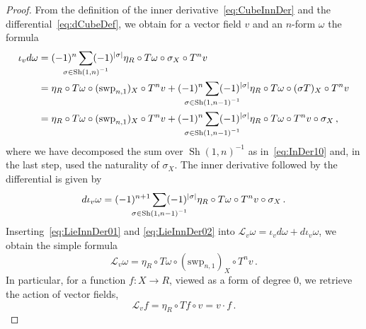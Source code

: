 \documentclass[12pt,reqno, a4paper]{amsart}
\numberwithin{equation}{section}
\theoremstyle{plain}
\theoremstyle{definition}
\theoremstyle{remark}
\DeclareMathOperator{\Shuff}{Sh}
\newcommand{\Lie}{\mathcal{L}}
\newcommand{\Val}{\eta}
\newcommand{\Swp}{\mathrm{swp}}
\begin{document}
\begin{proof}
From the definition of the inner derivative~\eqref{eq:CubeInnDer} and the differential~\eqref{eq:dCubeDef}, we obtain for a vector field $v$ and an $n$-form $\omega$ the formula
\begin{equation}
\label{eq:LieInnDer01}
\begin{split}
  \iota_v d\omega
  &=
  (-1)^n \sum_{\mathclap{\sigma \in \Shuff(1,n)^{-1} }}
  (-1)^{|\sigma|}\Val_R \circ T\omega \circ \sigma_X \circ T^n v
  \\
  &=
  \Val_R \circ T\omega \circ (\Swp_{n,1})_X \circ T^n v
  +
  (-1)^n \sum_{\mathclap{\sigma \in \Shuff(1,n-1)^{-1} }}
  (-1)^{|\sigma|}\Val_R \circ T\omega \circ (\sigma T)_X \circ T^n v
  \\
  &=
  \Val_R \circ T\omega \circ (\Swp_{n,1})_X \circ T^n v
  +
  (-1)^n \sum_{\mathclap{\sigma \in \Shuff(1,n-1)^{-1} }}
  (-1)^{|\sigma|}\Val_R \circ T\omega \circ T^n v \circ \sigma_X
  \,,
\end{split}
\end{equation}
where we have decomposed the sum over $\Shuff(1,n)^{-1}$ as in~\eqref{eq:InDer10} and, in the last step, used the naturality of $\sigma_X$. The inner derivative followed by the differential is given by
\begin{equation}
\label{eq:LieInnDer02}
  d \iota_v \omega
  =
  (-1)^{n+1} \sum_{\mathclap{\sigma \in \Shuff(1,n-1)^{-1} }}
  (-1)^{|\sigma|}\Val_R \circ T\omega \circ T^n v \circ \sigma_X
  \,.
\end{equation}
Inserting~\eqref{eq:LieInnDer01} and \eqref{eq:LieInnDer02} into $\Lie_v \omega = \iota_v d\omega + d \iota_v \omega$, we obtain the simple formula
\begin{equation}
\label{eq:LieDerFormula}
  \Lie_v \omega
  =
    \Val_R \circ T\omega \circ
    (\Swp_{n,1})_X \circ T^n v
  \,.
\end{equation}
In particular, for a function $f: X \to R$, viewed as a form of degree $0$, we retrieve the action of vector fields,
\begin{equation*}
  \Lie_v f = \Val_R \circ Tf \circ v = v \cdot f
  \,.
\end{equation*}


\end{proof}
\end{document}
